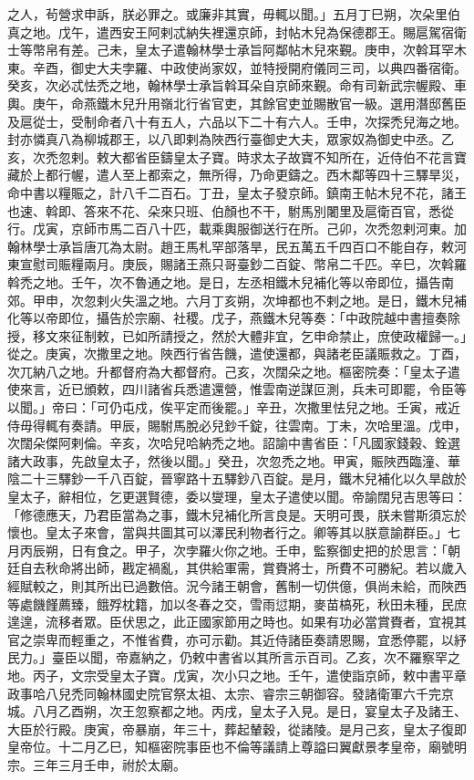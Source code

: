 \begin{pinyinscope}
之人，茍營求申訴，朕必罪之。或廉非其實，毋輒以聞。」五月丁巳朔，次朵里伯真之地。戊午，遣西安王阿剌忒納失裡還京師，封帖木兒為保德郡王。賜扈駕宿衛士等幣帛有差。己未，皇太子遣翰林學士承旨阿鄰帖木兒來覲。庚申，次斡耳罕木東。辛酉，御史大夫孛羅、中政使尚家奴，並特授開府儀同三司，以典四番宿衛。癸亥，次必忒怯禿之地，翰林學士承旨斡耳朵自京師來覲。命有司新武宗幄殿、車輿。庚午，命燕鐵木兒升用嶺北行省官吏，其餘官吏並賜散官一級。選用潛邸舊臣及扈從士，受制命者八十有五人，六品以下二十有六人。壬申，次探禿兒海之地。封亦憐真八為柳城郡王，以八即剌為陜西行臺御史大夫，眾家奴為御史中丞。乙亥，次禿忽剌。敕大都省臣鑄皇太子寶。時求太子故寶不知所在，近侍伯不花言寶藏於上都行幄，遣人至上都索之，無所得，乃命更鑄之。西木鄰等四十三驛旱災，命中書以糧賑之，計八千二百石。丁丑，皇太子發京師。鎮南王帖木兒不花，諸王也速、斡即、答來不花、朵來只班、伯顏也不干，駙馬別闍里及扈衛百官，悉從行。戊寅，京師市馬二百八十匹，載乘輿服御送行在所。己卯，次禿忽剌河東。加翰林學士承旨唐兀為太尉。趙王馬札罕部落旱，民五萬五千四百口不能自存，敕河東宣慰司賑糧兩月。庚辰，賜諸王燕只哥臺鈔二百錠、幣帛二千匹。辛巳，次斡羅斡禿之地。壬午，次不魯通之地。是日，左丞相鐵木兒補化等以帝即位，攝告南郊。甲申，次忽剌火失溫之地。六月丁亥朔，次坤都也不剌之地。是日，鐵木兒補化等以帝即位，攝告於宗廟、社稷。戊子，燕鐵木兒等奏：「中政院越中書擅奏除授，移文來征制敕，已如所請授之，然於大體非宜，乞申命禁止，庶使政權歸一。」從之。庚寅，次撒里之地。陜西行省告饑，遣使還都，與諸老臣議賑救之。丁酉，次兀納八之地。升都督府為大都督府。己亥，次闊朵之地。樞密院奏：「皇太子遣使來言，近已頒敕，四川諸省兵悉遣還營，惟雲南逆謀叵測，兵未可即罷，令臣等以聞。」帝曰：「可仍屯戍，俟平定而後罷。」辛丑，次撒里怯兒之地。壬寅，戒近侍毋得輒有奏請。甲辰，賜駙馬脫必兒鈔千錠，往雲南。丁未，次哈里溫。戊申，次闊朵傑阿剌倫。辛亥，次哈兒哈納禿之地。詔諭中書省臣：「凡國家錢穀、銓選諸大政事，先啟皇太子，然後以聞。」癸丑，次忽禿之地。甲寅，賑陜西臨潼、華陰二十三驛鈔一千八百錠，晉寧路十五驛鈔八百錠。是月，鐵木兒補化以久旱啟於皇太子，辭相位，乞更選賢德，委以燮理，皇太子遣使以聞。帝諭闊兒吉思等曰：「修德應天，乃君臣當為之事，鐵木兒補化所言良是。天明可畏，朕未嘗斯須忘於懷也。皇太子來會，當與共圖其可以澤民利物者行之。卿等其以朕意諭群臣。」七月丙辰朔，日有食之。甲子，次孛羅火你之地。壬申，監察御史把的於思言：「朝廷自去秋命將出師，戡定禍亂，其供給軍需，賞賚將士，所費不可勝紀。若以歲入經賦較之，則其所出已過數倍。況今諸王朝會，舊制一切供億，俱尚未給，而陜西等處饑饉薦臻，餓殍枕籍，加以冬春之交，雪雨愆期，麥苗槁死，秋田未種，民庶遑遑，流移者眾。臣伏思之，此正國家節用之時也。如果有功必當賞賚者，宜視其官之崇卑而輕重之，不惟省費，亦可示勸。其近侍諸臣奏請恩賜，宜悉停罷，以紓民力。」臺臣以聞，帝嘉納之，仍敕中書省以其所言示百司。乙亥，次不羅察罕之地。丙子，文宗受皇太子寶。戊寅，次小只之地。壬午，遣使詣京師，敕中書平章政事哈八兒禿同翰林國史院官祭太祖、太宗、睿宗三朝御容。發諸衛軍六千完京城。八月乙酉朔，次王忽察都之地。丙戌，皇太子入見。是日，宴皇太子及諸王、大臣於行殿。庚寅，帝暴崩，年三十，葬起輦穀，從諸陵。是月己亥，皇太子復即皇帝位。十二月乙巳，知樞密院事臣也不倫等議請上尊謚曰翼獻景孝皇帝，廟號明宗。三年三月壬申，祔於太廟。



\end{pinyinscope}